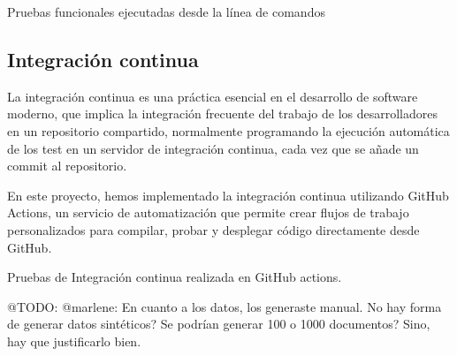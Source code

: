 Pruebas funcionales ejecutadas desde la línea de comandos

\subsection*{Integración continua}
La integración continua es una práctica esencial en el desarrollo de software moderno, que implica la integración
frecuente del trabajo de los desarrolladores en un repositorio compartido, normalmente programando la ejecución
automática de los test en un servidor de integración continua, cada vez que se añade un commit al repositorio.

En este proyecto, hemos implementado la integración continua utilizando GitHub Actions, un servicio de automatización
que permite crear flujos de trabajo personalizados para compilar, probar y desplegar código directamente desde GitHub.


Pruebas de Integración continua realizada en GitHub actions.

\colorbox{color_highlight}{@TODO: @marlene:}
En cuanto a los datos, los generaste manual. No hay forma de generar datos sintéticos? Se podrían generar 100 o 1000
documentos? Sino, hay que justificarlo bien.